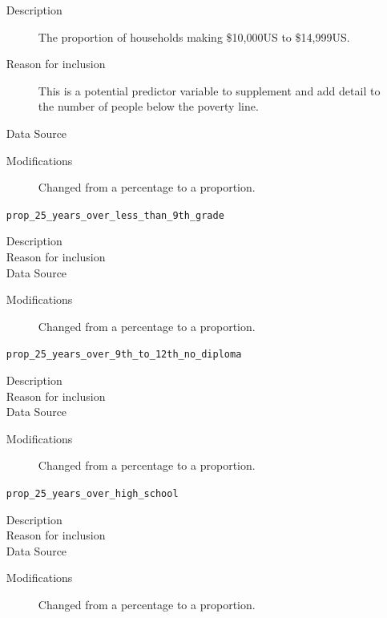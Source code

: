\documentclass{article}
\begin{document}
\begin{itemize}[label={}, align=left]
          \begin{description}
              \item[Description] The proportion of households making \$10,000US to
                    \$14,999US.
              \item[Reason for inclusion] This is a potential predictor variable
                    to supplement and add detail to the number of people below the
                    poverty line.
              \item[Data Source] \cite{acs_income_data}
              \item[Modifications] Changed from a percentage to a proportion.
          \end{description}
    \item[\texttt{prop\_25\_years\_over\_less\_than\_9th\_grade}] \
          \begin{description}
              \item[Description] 
              \item[Reason for inclusion] \educationreason
              \item[Data Source] \cite{acs_education_data}
              \item[Modifications] Changed from a percentage to a proportion.
          \end{description}
    \item[\texttt{prop\_25\_years\_over\_9th\_to\_12th\_no\_diploma}] \
          \begin{description}
              \item[Description] 
              \item[Reason for inclusion] \educationreason
              \item[Data Source] \cite{acs_education_data}
              \item[Modifications] Changed from a percentage to a proportion.
          \end{description}
    \item[\texttt{prop\_25\_years\_over\_high\_school}] \
          \begin{description}
              \item[Description] 
              \item[Reason for inclusion] \educationreason
              \item[Data Source] \cite{acs_education_data}
              \item[Modifications] Changed from a percentage to a proportion.

\end{description}
\end{itemize}
\end{document}
